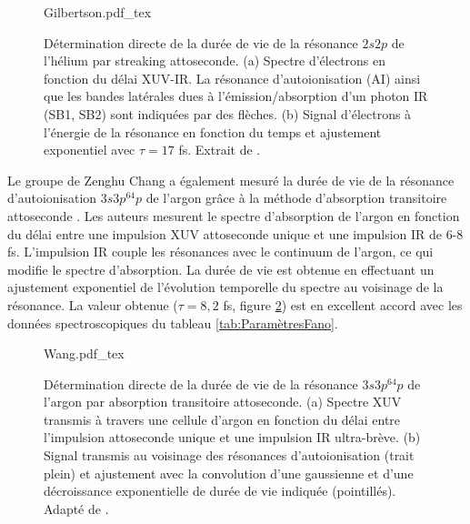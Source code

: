 \begin{figure}
\centering
\def\svgwidth{0.9\textwidth}
{Gilbertson.pdf_tex}
\caption{Détermination directe de la durée de vie de la résonance $2s2p$ de l'hélium par streaking attoseconde. (a) Spectre d'électrons en fonction du délai XUV-IR. La résonance d'autoionisation (AI) ainsi que les bandes latérales dues à l'émission/absorption d'un photon IR (SB1, SB2) sont indiquées par des flèches. (b) Signal d'électrons à l'énergie de la résonance en fonction du temps et ajustement exponentiel avec $\tau = 17$ fs. Extrait de .}
\label{fig:Gilbertson}
\end{figure}

Le groupe de Zenghu Chang a également mesuré la durée de vie de la résonance d'autoionisation $3s3p^64p$ de l'argon grâce à la méthode d'absorption transitoire attoseconde . Les auteurs mesurent le spectre d'absorption de l'argon en fonction du délai entre une impulsion XUV attoseconde unique et une impulsion IR de 6-8 fs. L'impulsion IR couple les résonances avec le continuum de l'argon, ce qui modifie le spectre d'absorption. La durée de vie est obtenue en effectuant un ajustement exponentiel de l'évolution temporelle du spectre au voisinage de la résonance. La valeur obtenue ($\tau = 8,2$ fs, figure \ref{fig:Wang}) est en excellent accord avec les données spectroscopiques du tableau \ref{tab:ParamètresFano}.

\begin{figure}
\centering
\def\svgwidth{0.9\textwidth}
{Wang.pdf_tex}
\caption{Détermination directe de la durée de vie de la résonance $3s3p^64p$ de l'argon par absorption transitoire attoseconde. (a) Spectre XUV transmis à travers une cellule d'argon en fonction du délai entre l'impulsion attoseconde unique et une impulsion IR ultra-brève. (b) Signal transmis au voisinage des résonances d'autoionisation (trait plein) et ajustement avec la convolution d'une gaussienne et d'une décroissance exponentielle de durée de vie indiquée (pointillés). Adapté de .}
\label{fig:Wang}
\end{figure}

